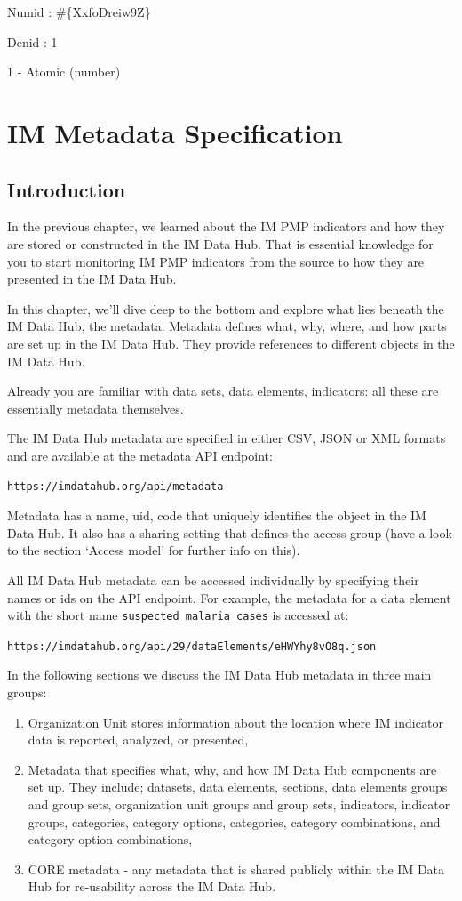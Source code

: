 \documentclass[]{book}
\providecommand{\tightlist}{%
  \setlength{\itemsep}{0pt}\setlength{\parskip}{0pt}}
\begin{document}
Numid : \#\{XxfoDreiw9Z\}

Denid : 1

1 - Atomic (number)

\hypertarget{meta}{%
\chapter{IM Metadata Specification}\label{meta}}

\hypertarget{introduction-2}{%
\section{Introduction}\label{introduction-2}}

In the previous chapter, we learned about the IM PMP indicators and how they are stored or constructed in the IM Data Hub. That is essential knowledge for you to start monitoring IM PMP indicators from the source to how they are presented in the IM Data Hub.

In this chapter, we'll dive deep to the bottom and explore what lies beneath the IM Data Hub, the metadata. Metadata defines what, why, where, and how parts are set up in the IM Data Hub. They provide references to different objects in the IM Data Hub.

Already you are familiar with data sets, data elements, indicators: all these are essentially metadata themselves.

The IM Data Hub metadata are specified in either CSV, JSON or XML formats and are available at the metadata API endpoint:

\texttt{https://imdatahub.org/api/metadata}

Metadata has a name, uid, code that uniquely identifies the object in the IM Data Hub. It also has a sharing setting that defines the access group (have a look to the section `Access model' for further info on this).

All IM Data Hub metadata can be accessed individually by specifying their names or ids on the API endpoint. For example, the metadata for a data element with the short name \texttt{suspected\ malaria\ cases} is accessed at:

\texttt{https://imdatahub.org/api/29/dataElements/eHWYhy8vO8q.json}

In the following sections we discuss the IM Data Hub metadata in three main groups:

\begin{enumerate}
\def\labelenumi{\arabic{enumi}.}
\tightlist
\item
  Organization Unit stores information about the location where IM indicator data is reported, analyzed, or presented,
\item
  Metadata that specifies what, why, and how IM Data Hub components are set up. They include; datasets, data elements, sections, data elements groups and group sets, organization unit groups and group sets, indicators, indicator groups, categories, category options, categories, category combinations, and category option combinations,
\item
  CORE metadata - any metadata that is shared publicly within the IM Data Hub for re-usability across the IM Data Hub.
\end{enumerate}
\end{document}
